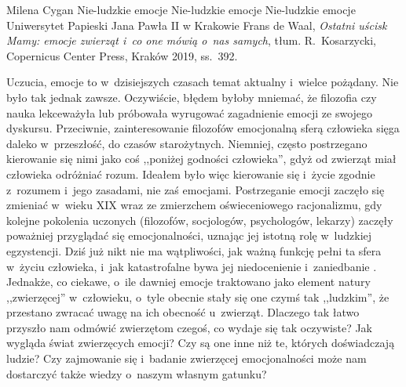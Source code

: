 \begin{newrevplenv}{Milena Cygan}
	{Nie-ludzkie emocje}
	{Nie-ludzkie emocje}
	{Nie-ludzkie emocje}
	{Uniwersytet Papieski Jana Pawła II w Krakowie}
	{Frans de Waal, \textit{Ostatni uścisk Mamy: emocje zwierząt i~co one mówią o~nas samych}, tłum. R.~Kosarzycki, Copernicus Center Press, Kraków 2019, ss.~392.}




\lettrine[loversize=0.13,lines=2,lraise=-0.03,nindent=0em,findent=0.2pt]%
{U}{}czucia, emocje to w~dzisiejszych czasach temat aktualny i~wielce pożądany. Nie było tak jednak zawsze. Oczywiście, błędem byłoby mniemać, że filozofia czy nauka lekceważyła lub próbowała wyrugować zagadnienie emocji ze swojego dyskursu. Przeciwnie, zainteresowanie filozofów emocjonalną sferą człowieka sięga daleko w~przeszłość, do czasów starożytnych. Niemniej, często postrzegano kierowanie się nimi jako coś ,,poniżej godności człowieka'', gdyż od zwierząt miał człowieka odróżniać rozum. Ideałem było więc kierowanie się i~życie zgodnie z~rozumem i~jego zasadami, nie zaś emocjami. Postrzeganie emocji zaczęło się zmieniać w~wieku XIX wraz ze zmierzchem oświeceniowego racjonalizmu, gdy kolejne pokolenia uczonych (filozofów, socjologów, psychologów, lekarzy) zaczęły poważniej przyglądać się emocjonalności, uznając jej istotną rolę w~ludzkiej egzystencji. Dziś już nikt nie ma wątpliwości, jak ważną funkcję pełni ta sfera w~życiu człowieka, i~jak katastrofalne bywa jej niedocenienie i~zaniedbanie
\parencites[][]{solomon_filozofia_2005}[][]{glos_negative_2017}. %
 Jednakże, co ciekawe, o~ile dawniej emocje traktowano jako element natury ,,zwierzęcej'' w~człowieku, o~tyle obecnie stały się one czymś tak ,,ludzkim'', że przestano zwracać uwagę na ich obecność u~zwierząt. Dlaczego tak łatwo przyszło nam odmówić zwierzętom czegoś, co wydaje się tak oczywiste? Jak wygląda świat zwierzęcych emocji? Czy są one inne niż te, których doświadczają ludzie? Czy zajmowanie się i~badanie zwierzęcej emocjonalności może nam dostarczyć także wiedzy o~naszym własnym gatunku?


\end{newrevplenv}
